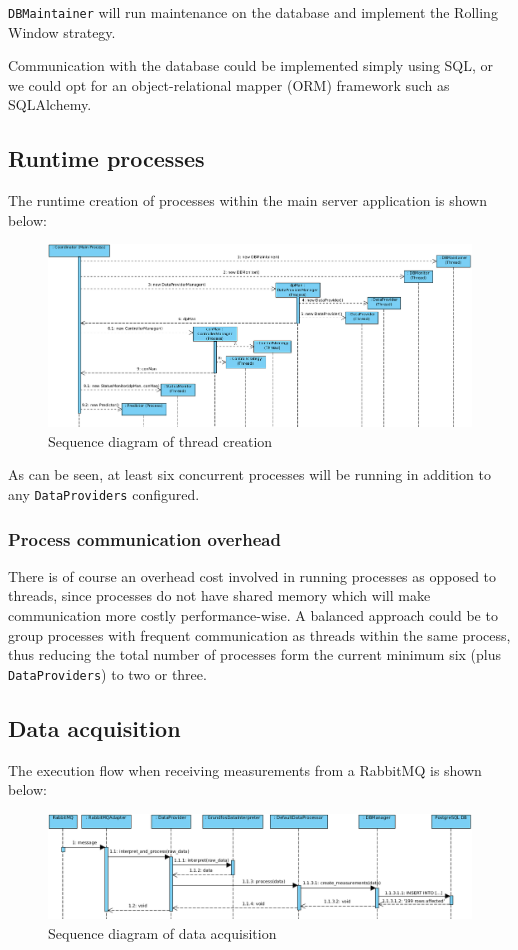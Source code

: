 \texttt{DBMaintainer} will run maintenance on the database and implement the Rolling Window strategy.

Communication with the database could be implemented simply using SQL, or we could opt for an object-relational mapper (ORM) framework such as SQLAlchemy.


\subsection{Runtime processes}

The runtime creation of processes within the main server application is shown below:
\begin{figure}[H]
    \centering
    \includegraphics[width=\textwidth]{figures/seq_diagram}
    \caption{Sequence diagram of thread creation}
    \label{figureSeqDiagram}
\end{figure}
As can be seen, at least six concurrent processes will be running in addition to any \texttt{DataProviders} configured.


\subsubsection{Process communication overhead}
There is of course an overhead cost involved in running processes as opposed to threads, since processes do not have shared memory which will make communication more costly performance-wise. A balanced approach could be to group processes with frequent communication as threads within the same process, thus reducing the total number of processes form the current minimum six (plus \texttt{DataProviders}) to two or three. 

\newpage
\subsection{Data acquisition}
The execution flow when receiving measurements from a RabbitMQ is shown below:
\begin{figure}[H]
    \centering
    \includegraphics[width=\textwidth]{figures/data_acq_seq_diagram}
    \caption{Sequence diagram of data acquisition}
    \label{figureSeqDiagram}
\end{figure}


